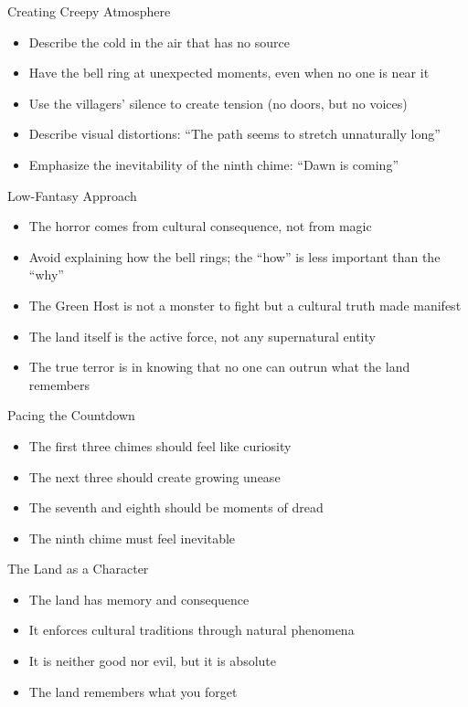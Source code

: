\documentclass[11pt]{article}
\begin{document}
\begin{mechanicsbox}{Creating Creepy Atmosphere}
\begin{itemize}
    \item Describe the cold in the air that has no source
    \item Have the bell ring at unexpected moments, even when no one is near it
    \item Use the villagers' silence to create tension (no doors, but no voices)
    \item Describe visual distortions: ``The path seems to stretch unnaturally long''
    \item Emphasize the inevitability of the ninth chime: ``Dawn is coming''
\end{itemize}
\end{mechanicsbox}

\begin{mechanicsbox}{Low-Fantasy Approach}
\begin{itemize}
    \item The horror comes from cultural consequence, not from magic
    \item Avoid explaining how the bell rings; the ``how'' is less important than the ``why''
    \item The Green Host is not a monster to fight but a cultural truth made manifest
    \item The land itself is the active force, not any supernatural entity
    \item The true terror is in knowing that no one can outrun what the land remembers
\end{itemize}
\end{mechanicsbox}

\begin{mechanicsbox}{Pacing the Countdown}
\begin{itemize}
    \item The first three chimes should feel like curiosity
    \item The next three should create growing unease
    \item The seventh and eighth should be moments of dread
    \item The ninth chime must feel inevitable
\end{itemize}
\end{mechanicsbox}

\begin{mechanicsbox}{The Land as a Character}
\begin{itemize}
    \item The land has memory and consequence
    \item It enforces cultural traditions through natural phenomena
    \item It is neither good nor evil, but it is absolute
    \item The land remembers what you forget
\end{itemize}
\end{mechanicsbox}
\end{document}
